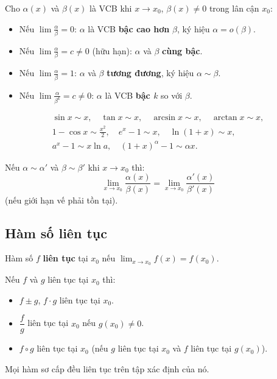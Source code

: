 \documentclass[12pt,a4paper]{article}
\begin{document}
\begin{dinhnghia}[title={So sánh các VCB}]
  Cho $\alpha(x)$ và $\beta(x)$ là VCB khi $x \to x_0$, $\beta(x) \ne 0$ trong lân cận $x_0$:
  \begin{itemize}
    \item Nếu $\displaystyle\lim \frac{\alpha}{\beta} = 0$: $\alpha$ là VCB \textbf{bậc cao hơn} $\beta$, ký hiệu $\alpha = o(\beta)$.
    \item Nếu $\displaystyle\lim \frac{\alpha}{\beta} = c \ne 0$ (hữu hạn): $\alpha$ và $\beta$ \textbf{cùng bậc}.
    \item Nếu $\displaystyle\lim \frac{\alpha}{\beta} = 1$: $\alpha$ và $\beta$ \textbf{tương đương}, ký hiệu $\alpha \sim \beta$.
    \item Nếu $\displaystyle\lim \frac{\alpha}{\beta^k} = c \ne 0$: $\alpha$ là VCB \textbf{bậc $k$} so với $\beta$.
  \end{itemize}
\end{dinhnghia}

\begin{congthuc}[title={Các VCB tương đương cơ bản khi $x \to 0$}]
  \begin{gather*}
    \sin x \sim x, \quad \tan x \sim x, \quad \arcsin x \sim x, \quad \arctan x \sim x, \\
    1 - \cos x \sim \frac{x^2}{2}, \quad e^x - 1 \sim x, \quad \ln(1+x) \sim x, \\
    a^x - 1 \sim x \ln a, \quad (1+x)^\alpha - 1 \sim \alpha x.
  \end{gather*}
\end{congthuc}

\begin{dinhly}[title={Nguyên lý thay thế VCB tương đương}]
  Nếu $\alpha \sim \alpha'$ và $\beta \sim \beta'$ khi $x \to x_0$ thì:
  \[
    \lim_{x \to x_0} \frac{\alpha(x)}{\beta(x)} = \lim_{x \to x_0} \frac{\alpha'(x)}{\beta'(x)}
  \]
  (nếu giới hạn vế phải tồn tại).
\end{dinhly}

\subsection{Hàm số liên tục}

\begin{dinhnghia}
  Hàm số $f$ \textbf{liên tục} tại $x_0$ nếu $\displaystyle\lim_{x \to x_0} f(x) = f(x_0)$.
\end{dinhnghia}

\begin{tinhchat}[title={Phép toán trên hàm liên tục}]
  Nếu $f$ và $g$ liên tục tại $x_0$ thì:
  \begin{itemize}
    \item $f \pm g$, \;$f \cdot g$ liên tục tại $x_0$.
    \item $\dfrac{f}{g}$ liên tục tại $x_0$ nếu $g(x_0) \ne 0$.
    \item $f \circ g$ liên tục tại $x_0$ (nếu $g$ liên tục tại $x_0$ và $f$ liên tục tại $g(x_0)$).
  \end{itemize}
  Mọi hàm sơ cấp đều liên tục trên tập xác định của nó.
\end{tinhchat}
\end{document}
